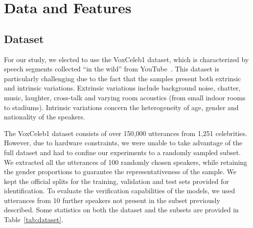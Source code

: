 \documentclass[conference]{IEEEtran}
\begin{document}
\section{Data and Features}

\subsection{Dataset}

For our study, we elected to use the VoxCeleb1 dataset, which is characterized by speech segments collected ``in the wild'' from YouTube~\cite{nagrani2020voxceleb,chung2018voxceleb2,chung2019delving}. This dataset is particularly challenging due to the fact that the samples present both extrinsic and intrinsic variations. Extrinsic variations include background noise, chatter, music, laughter, cross-talk and varying room acoustics (from small indoor rooms to stadiums). Intrinsic variations concern the heterogeneity of age, gender and nationality of the speakers. 

The VoxCeleb1 dataset consists of over 150,000 utterances from 1,251 celebrities. However, due to hardware constraints, we were unable to take advantage of the full dataset and had to confine our experiments to a randomly sampled subset. We extracted all the utterances of 100 randomly chosen speakers, while retaining the gender proportions to guarantee the representativeness of the sample. We kept the official splits for the training, validation and test sets provided for identification. To evaluate the verification capabilities of the models, we used utterances from 10 further speakers not present in the subset previously described. Some statistics on both the dataset and the subsets are provided in Table~\ref{tab:dataset}.
\end{document}
